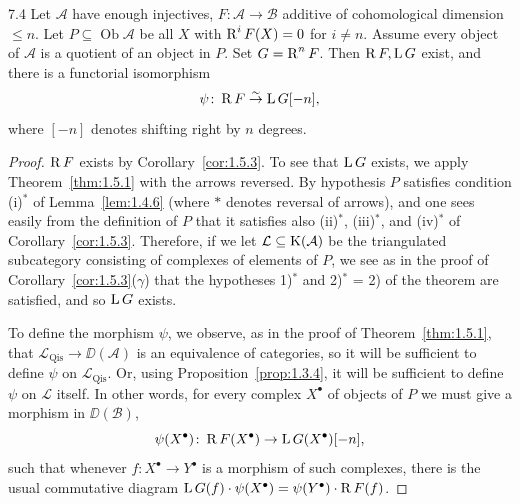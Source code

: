 \begin{bookproposition}{7.4}\label{prop:1.7.4}
Let $\mathcal{A}$ have enough injectives, $F\colon\mathcal{A}\to\mathcal{B}$ additive of cohomological dimension $\le n$.
Let $P\subseteq\operatorname{Ob}\mathcal{A}$ be all $X$ with $\operatorname{R}^iF(X)=0$ for $i\ne n$.
Assume every object of $\mathcal{A}$ is a quotient of an object in $P$.
Set $G=\operatorname{R}^nF$. Then $\operatorname{R} F,\operatorname{L} G$ exist, and there is a functorial isomorphism
\[
\psi\colon \operatorname{R} F \stackrel{\sim}{\to} \operatorname{L} G[-n],
\]
where $[-n]$ denotes shifting right by $n$ degrees.
\end{bookproposition}

\begin{proof}
$\operatorname{R} F$ exists by Corollary~\ref{cor:1.5.3}.
To see that $\operatorname{L} G$ exists, we apply Theorem~\ref{thm:1.5.1} with the arrows reversed.
By hypothesis $P$ satisfies condition (i)$^*$ of Lemma~\ref{lem:1.4.6} (where $*$ denotes reversal of arrows), and one sees easily from the definition of $P$ that it satisfies also (ii)$^*$, (iii)$^*$, and (iv)$^*$ of Corollary~\ref{cor:1.5.3}.
Therefore, if we let $\mathcal{L}\subseteq\operatorname{K}(\mathcal{A})$ be the triangulated subcategory consisting of complexes of elements of $P$, we see as in the proof of Corollary~\ref{cor:1.5.3}($\gamma$) that the hypotheses 1)$^*$ and 2)$^*$ = 2) of the theorem are satisfied, and so $\operatorname{L} G$ exists.

To define the morphism $\psi$, we observe, as in the proof of Theorem~\ref{thm:1.5.1}, that $\mathcal{L}_{\operatorname{Qis}}\to\DD(\mathcal{A})$ is an equivalence of categories, so it will be sufficient to define $\psi$ on $\mathcal{L}_{\operatorname{Qis}}$. Or, using Proposition~\ref{prop:1.3.4}, it will be sufficient to define $\psi$ on $\mathcal{L}$ itself.
In other words, for every complex $X^\bullet$ of objects of $P$ we must give a morphism in $\DD(\mathcal{B})$,
\[
\psi(X^\bullet)\colon \operatorname{R} F(X^\bullet)\to \operatorname{L} G(X^\bullet)[-n],
\]
such that whenever $f\colon X^\bullet\to Y^\bullet$ is a morphism of such complexes, there is the usual commutative diagram
$\operatorname{L} G(f)\cdot\psi(X^\bullet)=\psi(Y^\bullet)\cdot\operatorname{R} F(f)$.



\end{proof}
